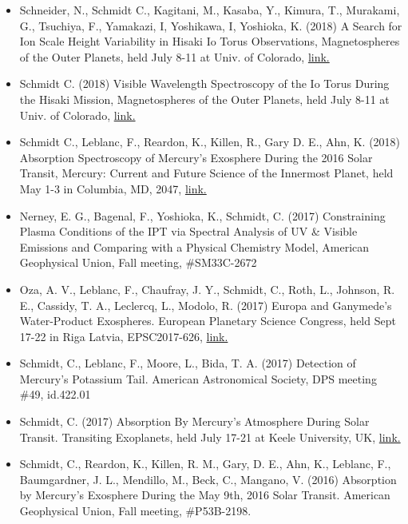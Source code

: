 \documentclass[12pt]{report}
\begin{document}
\begin{itemize}
   \item Schneider, N., Schmidt C., Kagitani, M., Kasaba, Y., Kimura, T., Murakami, G., Tsuchiya, F., Yamakazi, I, Yoshikawa, I, Yoshioka, K. (2018) A Search for Ion Scale Height Variability in Hisaki Io Torus Observations, Magnetospheres of the Outer Planets, held July 8-11 at Univ. of Colorado, \href{https://lasp.colorado.edu/home/mop/files/2018/07/Mop2018-Program-Online-PDF-A-Version-No-Covers.pdf/}{link.} 
   \item Schmidt C. (2018) Visible Wavelength Spectroscopy of the Io Torus During the Hisaki Mission, Magnetospheres of the Outer Planets, held July 8-11 at Univ. of Colorado, \href{https://lasp.colorado.edu/home/mop/files/2018/07/Mop2018-Program-Online-PDF-A-Version-No-Covers.pdf/}{link.} 
   \item Schmidt C., Leblanc, F., Reardon, K., Killen, R., Gary D. E., Ahn, K. (2018) Absorption Spectroscopy of Mercury's Exosphere During the 2016 Solar Transit, Mercury: Current and Future Science of the Innermost Planet, held May 1-3 in Columbia, MD, 2047, \href{https://www.hou.usra.edu/meetings/mercury2018/pdf/6022.pdf}{link.} 
   \item Nerney, E. G., Bagenal, F., Yoshioka, K., Schmidt, C. (2017) Constraining Plasma Conditions of the IPT via Spectral Analysis of UV \& Visible Emissions and Comparing with a Physical Chemistry Model, American Geophysical Union, Fall meeting, \#SM33C-2672
   \item Oza, A. V., Leblanc, F., Chaufray, J. Y., Schmidt, C., Roth, L., Johnson, R. E., Cassidy, T. A., Leclercq, L., Modolo, R. (2017) Europa and Ganymede's Water-Product Exospheres. European Planetary Science Congress, held Sept 17-22 in Riga Latvia, EPSC2017-626, \href{https://meetingorganizer.copernicus.org/EPSC2017/EPSC2017-626-1.pdf}{link.} 
   \item Schmidt, C., Leblanc, F., Moore, L., Bida, T. A. (2017) Detection of Mercury's Potassium Tail. American Astronomical Society, DPS meeting \#49, id.422.01
   \item Schmidt, C. (2017) Absorption By Mercury's Atmosphere During Solar Transit. Transiting Exoplanets, held July 17-21 at Keele University, UK, \href{https://wasp-planets.net/conference/talk-abstracts/#44}{link.} 
   \item Schmidt, C., Reardon, K., Killen, R. M., Gary, D. E., Ahn, K., Leblanc, F., Baumgardner, J. L., Mendillo, M., Beck, C., Mangano, V. (2016) Absorption by Mercury's Exosphere During the May 9th, 2016 Solar Transit. American Geophysical Union, Fall meeting, \#P53B-2198.

\end{itemize}
\end{document}
